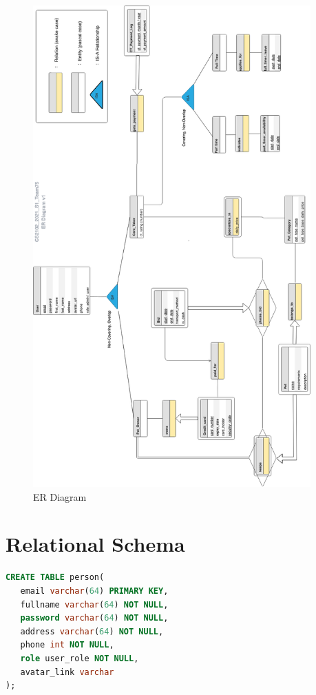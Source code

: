 \documentclass[
  paper=a4,
  ,captions=tableheading
]{scrartcl}
\begin{document}
\begin{figure}
\centering
\includegraphics[width=0.95\textwidth,height=\textheight]{./er_diagram.png}
\caption{ER Diagram}
\end{figure}

\hypertarget{relational-schema}{%
\section{Relational Schema}\label{relational-schema}}

\begin{lstlisting}[language=SQL]
CREATE TABLE person(
   email varchar(64) PRIMARY KEY,
   fullname varchar(64) NOT NULL,
   password varchar(64) NOT NULL,
   address varchar(64) NOT NULL,
   phone int NOT NULL,
   role user_role NOT NULL,
   avatar_link varchar
);
\end{lstlisting}
\end{document}
